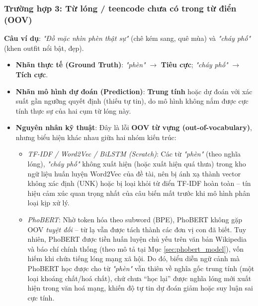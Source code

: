 \documentclass[12pt,a4paper]{article}
\begin{document}
\subsubsection{Trường hợp 3: Từ lóng / teencode chưa có trong từ điển (OOV)}\label{sec:error_oov_slang}
\textbf{Câu ví dụ}: \textit{"Đồ mặc nhìn phèn thật sự"} (chê kém sang, quê mùa) và \textit{"cháy phố"} (khen outfit nổi bật, đẹp).

\begin{itemize}[leftmargin=1.0cm, itemsep=2pt]
    \item[--] \textbf{Nhãn thực tế (Ground Truth)}: \textit{"phèn"} $\to$ \textbf{Tiêu cực}; \textit{"cháy phố"} $\to$ \textbf{Tích cực}.
    \item[--] \textbf{Nhãn mô hình dự đoán (Prediction)}: \textbf{Trung tính} hoặc dự đoán với xác suất gần ngưỡng quyết định (thiếu tự tin), do mô hình không nắm được cực tính thực sự của hai cụm từ lóng này.
    \item[--] \textbf{Nguyên nhân kỹ thuật}: Đây là lỗi \textbf{OOV từ vựng (out-of-vocabulary)}, nhưng biểu hiện khác nhau giữa hai nhóm kiến trúc:
    \begin{itemize}[leftmargin=0.6cm, itemsep=1pt]
        \item \textit{TF-IDF / Word2Vec / BiLSTM (Scratch)}: Các từ \textit{"phèn"} (theo nghĩa lóng), \textit{"cháy phố"} không xuất hiện (hoặc xuất hiện quá thưa) trong kho ngữ liệu huấn luyện Word2Vec của đề tài, nên bị ánh xạ thành vector không xác định (UNK) hoặc bị loại khỏi từ điển TF-IDF hoàn toàn -- tín hiệu cảm xúc quan trọng nhất của câu biến mất trước khi mô hình phân loại kịp xử lý.
        \item \textit{PhoBERT}: Nhờ token hóa theo subword (BPE), PhoBERT không gặp OOV \textit{tuyệt đối} -- từ lạ vẫn được tách thành các đơn vị con đã biết. Tuy nhiên, PhoBERT được tiền huấn luyện chủ yếu trên văn bản Wikipedia và báo chí chính thống (theo mô tả tại Mục \ref{sec:phobert_model}), vốn hiếm khi chứa tiếng lóng mạng xã hội. Do đó, biểu diễn ngữ cảnh mà PhoBERT học được cho từ \textit{"phèn"} vẫn thiên về nghĩa gốc trung tính (một loại khoáng chất/hoá chất), chứ chưa ``học lại'' được nghĩa lóng mới xuất hiện trong văn hoá mạng, khiến độ tự tin dự đoán giảm hoặc suy luận sai cực tính.
    \end{itemize}
\end{itemize}
\end{document}
